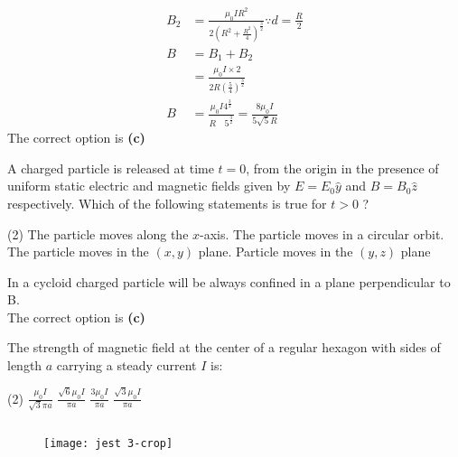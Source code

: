 \begin{enumerate}
\begin{answer}
\begin{align*}
		B_{2}&=\frac{\mu_{0} I R^{2}}{2\left(R^{2}+\frac{R^{2}}{4}\right)^{\frac{3}{2}}} \because d=\frac{R}{2} \\
		B&=B_{1}+B_{2}\\
		&=\frac{\mu_{0} I \times 2}{2 R\left(\frac{5}{4}\right)^{\frac{3}{2}}}\\
		B&=\frac{\mu_{0} I 4^{\frac{3}{2}}}{R \quad 5^{\frac{3}{2}}}=\frac{8 \mu_{0} I}{5 \sqrt{5} R}
		\end{align*}
		The correct option is \textbf{(c)}	
	\end{answer}
	\begin{minipage}{\textwidth}
		\item A charged particle is released at time $t=0$, from the origin in the presence of uniform static electric and magnetic fields given by $E=E_{0} \hat{y}$ and $B=B_{0} \hat{z}$ respectively. Which of the following statements is true for $t>0$ ?
	\end{minipage}
	\begin{tasks}(2)
		\task[\textbf{A.}] The particle moves along the $x$-axis.
		\task[\textbf{B.}]The particle moves in a circular orbit.
		\task[\textbf{C.}]The particle moves in the $(x, y)$ plane.
		\task[\textbf{D.}] Particle moves in the $(y, z)$ plane
	\end{tasks}
	\begin{answer}
		In a cycloid charged particle will be always confined in a plane perpendicular to B.\\
		The correct option is \textbf{(c)}
	\end{answer}
	\begin{minipage}{\textwidth}
		\item The strength of magnetic field at the center of a regular hexagon with sides of length $a$ carrying a steady current $I$ is:
	\end{minipage}
	\begin{tasks}(2)
		\task[\textbf{A.}] $\frac{\mu_{0} I}{\sqrt{3} \pi a}$ 
		\task[\textbf{B.}]$\frac{\sqrt{6} \mu_{0} I}{\pi a}$
		\task[\textbf{C.}]$\frac{3 \mu_{0} I}{\pi a}$
		\task[\textbf{D.}]$\frac{\sqrt{3} \mu_{0} I}{\pi a}$
	\end{tasks}
	\begin{answer}$\left. \right. $\\
		\begin{figure}[H]
			\centering
			\texttt{[image: jest 3-crop]}
		\end{figure}
		\begin{align*}

\end{align*}
\end{answer}
\end{enumerate}
